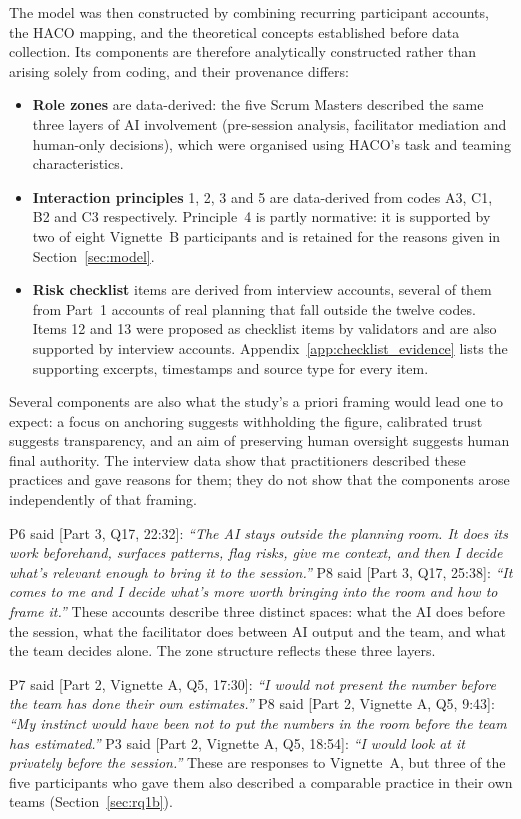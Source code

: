 \documentclass[a4paper,twoside]{bth}
\begin{document}
The model was then constructed by combining recurring participant accounts, the HACO mapping, and the theoretical concepts established before data collection. Its components are therefore analytically constructed rather than arising solely from coding, and their provenance differs:
\begin{itemize}
  \item \textbf{Role zones} are data-derived: the five Scrum Masters described the same three layers of AI involvement (pre-session analysis, facilitator mediation and human-only decisions), which were organised using HACO's task and teaming characteristics.
  \item \textbf{Interaction principles} 1, 2, 3 and 5 are data-derived from codes A3, C1, B2 and C3 respectively. Principle~4 is partly normative: it is supported by two of eight Vignette~B participants and is retained for the reasons given in Section~\ref{sec:model}.
  \item \textbf{Risk checklist} items are derived from interview accounts, several of them from Part~1 accounts of real planning that fall outside the twelve codes. Items 12 and 13 were proposed as checklist items by validators and are also supported by interview accounts. Appendix~\ref{app:checklist_evidence} lists the supporting excerpts, timestamps and source type for every item.
\end{itemize}
Several components are also what the study's a priori framing would lead one to expect: a focus on anchoring suggests withholding the figure, calibrated trust suggests transparency, and an aim of preserving human oversight suggests human final authority. The interview data show that practitioners described these practices and gave reasons for them; they do not show that the components arose independently of that framing.

P6 said [Part 3, Q17, 22:32]: \textit{``The AI stays outside the planning room. It does its work beforehand, surfaces patterns, flag risks, give me context, and then I decide what's relevant enough to bring it to the session.''} P8 said [Part 3, Q17, 25:38]: \textit{``It comes to me and I decide what's more worth bringing into the room and how to frame it.''} These accounts describe three distinct spaces: what the AI does before the session, what the facilitator does between AI output and the team, and what the team decides alone. The zone structure reflects these three layers.

P7 said [Part 2, Vignette A, Q5, 17:30]: \textit{``I would not present the number before the team has done their own estimates.''} P8 said [Part 2, Vignette A, Q5, 9:43]: \textit{``My instinct would have been not to put the numbers in the room before the team has estimated.''} P3 said [Part 2, Vignette A, Q5, 18:54]: \textit{``I would look at it privately before the session.''} These are responses to Vignette~A, but three of the five participants who gave them also described a comparable practice in their own teams (Section~\ref{sec:rq1b}).
\end{document}
